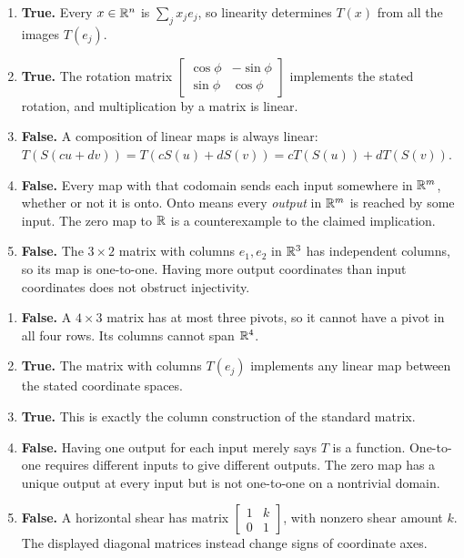 \begin{enumerate}[label=(\alph*)]
\item \textbf{True.} Every $x\in\mathbb{R}^n$ is $\sum_jx_je_j$, so linearity
determines $T(x)$ from all the images $T(e_j)$.
\item \textbf{True.} The rotation matrix
$\begin{bmatrix}\cos\phi&-\sin\phi\\\sin\phi&\cos\phi\end{bmatrix}$
implements the stated rotation, and multiplication by a matrix is linear.
\item \textbf{False.} A composition of linear maps is always linear:
$T(S(cu+dv))=T(cS(u)+dS(v))=cT(S(u))+dT(S(v))$.
\item \textbf{False.} Every map with that codomain sends each input
somewhere in $\mathbb{R}^m$, whether or not it is onto. Onto means every
\emph{output} in $\mathbb{R}^m$ is reached by some input. The zero map to
$\mathbb{R}$ is a counterexample to the claimed implication.
\item \textbf{False.} The $3\times2$ matrix with columns $e_1,e_2$
in $\mathbb{R}^3$ has independent columns, so its map is one-to-one.
Having more output coordinates than input coordinates does not obstruct injectivity.
\end{enumerate}

\begin{enumerate}[label=(\alph*)]
\item \textbf{False.} A $4\times3$ matrix has at most three pivots,
so it cannot have a pivot in all four rows. Its columns cannot span $\mathbb{R}^4$.
\item \textbf{True.} The matrix with columns $T(e_j)$ implements any
linear map between the stated coordinate spaces.
\item \textbf{True.} This is exactly the column construction of the standard matrix.
\item \textbf{False.} Having one output for each input merely says
$T$ is a function. One-to-one requires different inputs to give different
outputs. The zero map has a unique output at every input but is not one-to-one
on a nontrivial domain.
\item \textbf{False.} A horizontal shear has matrix
$\begin{bmatrix}1&k\\0&1\end{bmatrix}$, with nonzero shear amount $k$.
The displayed diagonal matrices instead change signs of coordinate axes.
\end{enumerate}

